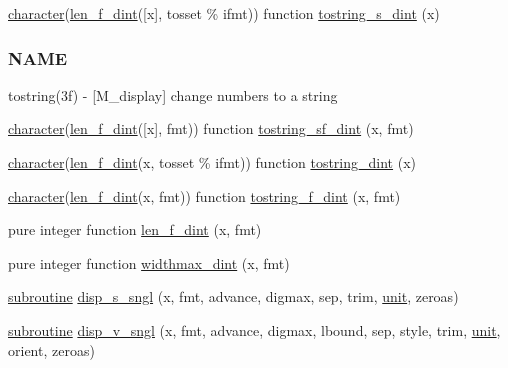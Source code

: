 \begin{DoxyCompactItemize}
\item 
\hyperlink{option__stopwatch_83_8txt_abd4b21fbbd175834027b5224bfe97e66}{character}(\hyperlink{namespacem__display_a6a2709cf5f243ee492f223b40c6b5143}{len\+\_\+f\+\_\+dint}(\mbox{[}x\mbox{]}, tosset \% ifmt)) function \hyperlink{namespacem__display_a5bfeb905fb5036068ef0012eb2f563fa}{tostring\+\_\+s\+\_\+dint} (x)
\begin{DoxyCompactList}\small\item\em \subsubsection*{N\+A\+ME}

tostring(3f) -\/ \mbox{[}M\+\_\+display\mbox{]} change numbers to a string \end{DoxyCompactList}\item 
\hyperlink{option__stopwatch_83_8txt_abd4b21fbbd175834027b5224bfe97e66}{character}(\hyperlink{namespacem__display_a6a2709cf5f243ee492f223b40c6b5143}{len\+\_\+f\+\_\+dint}(\mbox{[}x\mbox{]}, fmt)) function \hyperlink{namespacem__display_aa7d1fb61fc22bddb9232eaa13aaaa43f}{tostring\+\_\+sf\+\_\+dint} (x, fmt)
\item 
\hyperlink{option__stopwatch_83_8txt_abd4b21fbbd175834027b5224bfe97e66}{character}(\hyperlink{namespacem__display_a6a2709cf5f243ee492f223b40c6b5143}{len\+\_\+f\+\_\+dint}(x, tosset \% ifmt)) function \hyperlink{namespacem__display_a5a8479cdf49ed905e9c54cc2f86cea16}{tostring\+\_\+dint} (x)
\item 
\hyperlink{option__stopwatch_83_8txt_abd4b21fbbd175834027b5224bfe97e66}{character}(\hyperlink{namespacem__display_a6a2709cf5f243ee492f223b40c6b5143}{len\+\_\+f\+\_\+dint}(x, fmt)) function \hyperlink{namespacem__display_ac1dd519655fda1c495ba40efe16fbc0b}{tostring\+\_\+f\+\_\+dint} (x, fmt)
\item 
pure integer function \hyperlink{namespacem__display_a6a2709cf5f243ee492f223b40c6b5143}{len\+\_\+f\+\_\+dint} (x, fmt)
\item 
pure integer function \hyperlink{namespacem__display_a8310ed88204e0715b21b2afb0a6d12ac}{widthmax\+\_\+dint} (x, fmt)
\item 
\hyperlink{M__stopwatch_83_8txt_acfbcff50169d691ff02d4a123ed70482}{subroutine} \hyperlink{namespacem__display_a7a66451f6a0931ee7552ee4d8918ac20}{disp\+\_\+s\+\_\+sngl} (x, fmt, advance, digmax, sep, trim, \hyperlink{M__stopwatch_83_8txt_a5cbef30eb7c0d734bd82f5a7ebea9aa7}{unit}, zeroas)
\item 
\hyperlink{M__stopwatch_83_8txt_acfbcff50169d691ff02d4a123ed70482}{subroutine} \hyperlink{namespacem__display_a4ef66ee3da74984dd06012837795c459}{disp\+\_\+v\+\_\+sngl} (x, fmt, advance, digmax, lbound, sep, style, trim, \hyperlink{M__stopwatch_83_8txt_a5cbef30eb7c0d734bd82f5a7ebea9aa7}{unit}, orient, zeroas)

\end{DoxyCompactItemize}

